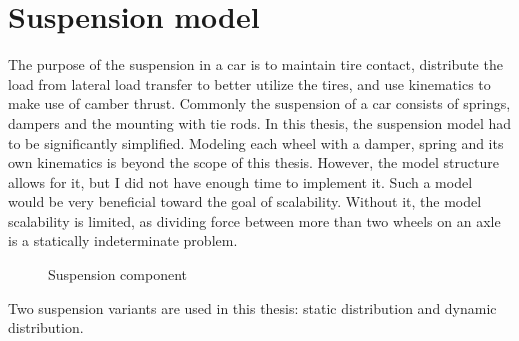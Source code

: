 \section{Suspension model}
The purpose of the suspension in a car is to maintain tire contact, distribute the load from lateral load transfer to better utilize the tires, and use kinematics to make use of camber thrust. Commonly the suspension of a car consists of springs, dampers and the mounting with tie rods. In this thesis, the suspension model had to be significantly simplified. Modeling each wheel with a damper, spring and its own kinematics is beyond the scope of this thesis. However, the model structure allows for it, but I did not have enough time to implement it. Such a model would be very beneficial toward the goal of scalability. Without it, the model scalability is limited, as dividing force between more than two wheels on an axle is a statically indeterminate problem.
\begin{figure}[H]
    \centering
    \caption{Suspension component}\label{fig:suspension}
\end{figure}
Two suspension variants are used in this thesis: static distribution and dynamic distribution.

